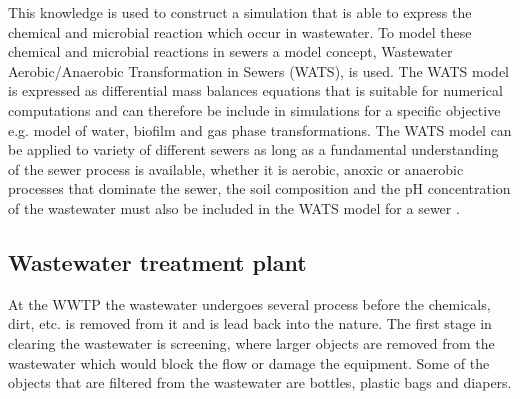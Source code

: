 This knowledge is used to construct a simulation that is able to express the chemical and microbial reaction which occur in wastewater. %
To model these chemical and microbial reactions in sewers a model concept, Wastewater Aerobic/Anaerobic Transformation in Sewers (WATS), is used. The WATS model is expressed as differential mass balances equations that is suitable for numerical computations and can therefore be include in simulations for a specific objective e.g. model of water, biofilm and gas phase transformations. The WATS model can be applied to variety of different sewers as long as a fundamental understanding of the sewer process is available, whether it is aerobic, anoxic or anaerobic processes that dominate the sewer, the soil composition and the pH concentration of the wastewater must also be included in the WATS model for a sewer \cite{Sewer_processes}.     





\subsection{Wastewater treatment plant}\label{subse:Wastewater treatment plant}
At the WWTP the wastewater undergoes several process before the chemicals, dirt, etc. is removed from it and is lead back into the nature. The first stage in clearing the wastewater is screening, where larger objects are removed from the wastewater which would block the flow or damage the equipment. Some of the objects that are filtered from the wastewater are bottles, plastic bags and diapers.  %

